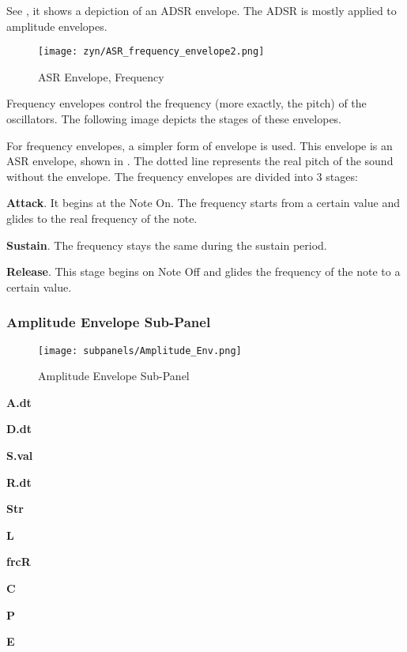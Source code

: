    See ,
   it shows a depiction of an ADSR envelope.
   The ADSR is mostly applied to amplitude envelopes.

\begin{figure}[H]
   \centering
   \texttt{[image: zyn/ASR\_frequency\_envelope2.png]}
   \caption{ASR Envelope, Frequency}
   \label{fig:asr_envelope_depiction}
\end{figure}

   Frequency envelopes control the frequency (more exactly, the pitch) of the
   oscillators. The following image depicts the stages of these envelopes.

   For frequency envelopes, a simpler form of envelope is used.
   This envelope is an ASR envelope, shown in
   .
   The dotted line represents the real pitch of the sound without the envelope.
   The frequency envelopes are divided into 3 stages:

   \begin{enumber}
      \item \textbf{Attack}.
      It begins at the Note On. The frequency starts from a certain value and
      glides to the real frequency of the note.
      \item \textbf{Sustain}.
      The frequency stays the same during the sustain period.
      \item \textbf{Release}.
      This stage begins on Note Off and glides the frequency of the note to a
      certain value.
   \end{enumber}

\subsubsection{Amplitude Envelope Sub-Panel}
\label{subsubsec:amplitude_envelope_subpanel}

\begin{figure}[H]
   \centering
   \texttt{[image: subpanels/Amplitude\_Env.png]}
   \caption[Amplitude Envelope Sub-Panel]{Amplitude Envelope Sub-Panel}
   \label{fig:amplitude_env}
\end{figure}

   \begin{enumber}
      \item \textbf{A.dt}
      \item \textbf{D.dt}
      \item \textbf{S.val}
      \item \textbf{R.dt}
      \item \textbf{Str}
      \item \textbf{L}
      \item \textbf{frcR}
      \item \textbf{C}
      \item \textbf{P}
      \item \textbf{E}
   \end{enumber}

